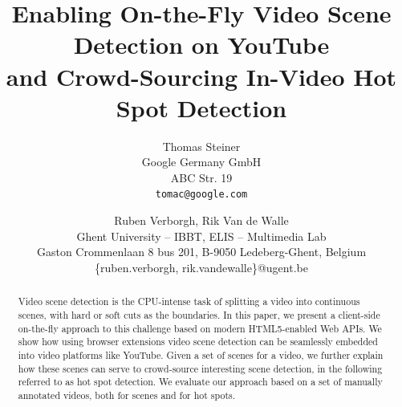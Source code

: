 \documentclass[10pt,twocolumn,letterpaper]{article}
\begin{document}
\title{Enabling On-the-Fly Video Scene Detection on YouTube\\ and Crowd-Sourcing In-Video Hot Spot Detection}

\author{Thomas Steiner\\
Google Germany GmbH\\
ABC Str. 19\\
{\tt\small tomac@google.com}
\and
Ruben Verborgh, Rik Van de Walle \\
Ghent University -- IBBT, ELIS -- Multimedia Lab\\
Gaston Crommenlaan 8 bus 201, B-9050 Ledeberg-Ghent, Belgium\\
{\small \{ruben.verborgh, rik.vandewalle\}@ugent.be}
}

\maketitle

\begin{abstract}
Video scene detection is the CPU-intense task of splitting a video into continuous scenes, with hard or soft cuts as the boundaries. In this paper, we present a client-side on-the-fly approach to this challenge based on modern HTML5-enabled Web APIs. We show how using browser extensions video scene detection can be seamlessly embedded into video platforms like YouTube. Given a set of scenes for a video, we further explain how these scenes can serve to crowd-source interesting scene detection, in the following referred to as hot spot detection. We evaluate our approach based on a set of manually annotated videos, both for scenes and for hot spots.
\end{abstract}

\end{document}
